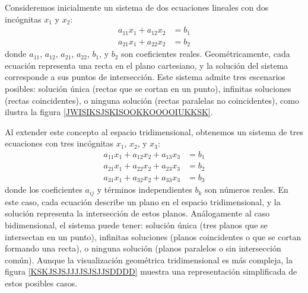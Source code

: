 Consideremos inicialmente un sistema de dos ecuaciones lineales con dos incógnitas $x_1$ y $x_2$:
\begin{align*}
    a_{11}x_1 + a_{12}x_2 & = b_1 \\ 
    a_{21}x_1 + a_{22}x_2 & = b_2
\end{align*}
donde $a_{11}$, $a_{12}$, $a_{21}$, $a_{22}$, $b_1$, y $b_2$ son coeficientes reales. Geométricamente, cada ecuación representa una recta en el plano cartesiano, y la solución del sistema corresponde a sus puntos de intersección. Este sistema admite tres escenarios posibles: solución única (rectas que se cortan en un punto), infinitas soluciones (rectas coincidentes), o ninguna solución (rectas paralelas no coincidentes), como ilustra la figura \ref{JWISIKSJSKISOOKKOOOOIUKKSK}.

Al extender este concepto al espacio tridimensional, obtenemos un sistema de tres ecuaciones con tres incógnitas $x_1$, $x_2$, y $x_3$:
\begin{align*}
    a_{11}x_1 + a_{12}x_2 + a_{13}x_3 & = b_1 \\ 
    a_{21}x_1 + a_{22}x_2 + a_{23}x_3 & = b_2 \\ 
    a_{31}x_1 + a_{32}x_2 + a_{33}x_3 & = b_3
\end{align*}
donde los coeficientes $a_{ij}$ y términos independientes $b_k$ son números reales. En este caso, cada ecuación describe un plano en el espacio tridimensional, y la solución representa la intersección de estos planos. Análogamente al caso bidimensional, el sistema puede tener: solución única (tres planos que se intersectan en un punto), infinitas soluciones (planos coincidentes o que se cortan formando una recta), o ninguna solución (planos paralelos o sin intersección común). Aunque la visualización geométrica tridimensional es más compleja, la figura \ref{KSKJSJSJJJJSJSJJSDDDD} muestra una representación simplificada de estos posibles casos.
\newpage
